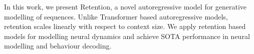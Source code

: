 In this work, we present Retention, a novel autoregressive model for generative modelling of sequences. Unlike Transformer based autoregressive models, retention scales linearly with respect to context size. We apply retention based models for modelling neural dynamics and achieve SOTA performance in neural modelling and behaviour decoding.